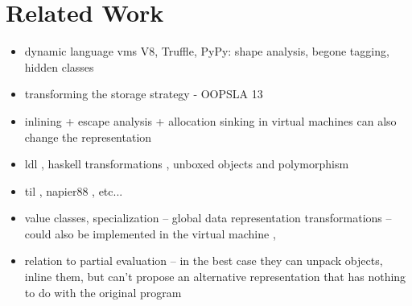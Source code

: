 \section{Related Work}
\label{sec:related}


\begin{itemize}
  \item dynamic language vms V8, Truffle, PyPy: shape analysis, begone tagging, hidden classes
  \item transforming the storage strategy - OOPSLA 13
  \item inlining + escape analysis + allocation sinking in virtual machines can also change the representation
  \item ldl \cite{ldl}, haskell transformations \cite{spj-unboxed-values} \cite{thiemann-unboxed-objects-cps} \cite{shao-flexible-representation-analysis}, unboxed objects and polymorphism \cite{leroy-unboxed-objects}
  \item til \cite{tarditi-til} \cite{harper-intensional-type-analysis}, napier88 \cite{morrison-napier88}, etc...
  \item value classes\cite{sip-value-classes}, specialization \cite{iuli-thesis} \cite{miniboxing} -- global data representation transformations -- could also be implemented in the virtual machine \cite{goetz-specialization}, \cite{rose-value-classes-vm} \cite{rose-value-classes-tearing}
  \item relation to partial evaluation -- in the best case they can unpack objects, inline them, but can't propose an alternative representation that has nothing to do with the original program
\end{itemize}
